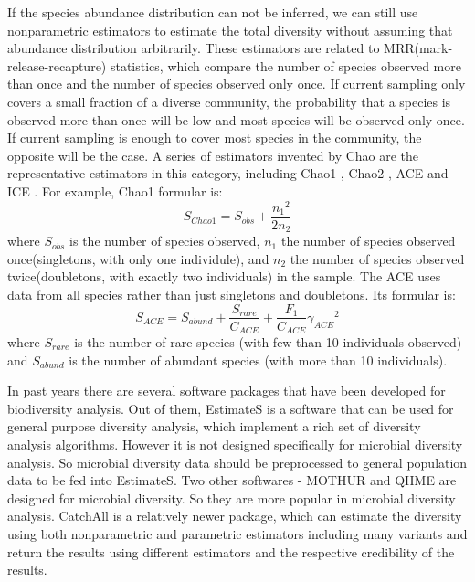 If the species abundance distribution can not be inferred, we can still use nonparametric estimators to estimate the 
total diversity without assuming that abundance distribution arbitrarily. These estimators are related to MRR(mark-release-recapture)
 statistics, which compare the number of species observed more than once and the number of species observed only once. 
If current sampling only covers a small fraction of a diverse community, the probability that a species is observed more
 than once will be low and most species will be observed only once. If current sampling is enough to cover most species in
 the community, the opposite will be the case. A series of estimators invented by Chao are the representative estimators
 in this category, including Chao1 \cite{chao1984nonparametric}, Chao2 \cite{Chao:1987aa}, ACE \cite{chao1993stopping} 
 and ICE \cite{lee1994estimating}. For example, Chao1 formular is:\\
 $${S}_{Chao1}={S}_{obs}+\frac{{{n}_{1}}^{2}}{2{n}_{2}}$$
 where ${S}_{obs}$ is the number of species observed, ${n}_{1}$ the number of species observed once(singletons, with only one individule),
 and ${n}_{2}$ the number of species observed twice(doubletons, with exactly two individuals) in the sample. The ACE uses data from
  all species rather than just singletons and doubletons. Its formular is:\\
 $${S}_{ACE}={S}_{abund}+\frac{{S}_{rare}}{{C}_{ACE}}+\frac{{F}_{1}}{{C}_{ACE}}{{\gamma }_{ACE}}^{2}$$
where ${S}_{rare}$ is the number of rare species (with few than 10 individuals observed) and ${S}_{abund}$ is the number of 
abundant species (with more than 10 individuals). 

In past years there are several software packages that have been developed for biodiversity
analysis. Out of them, EstimateS \cite{colwellestimates} is a software that can be used for general purpose diversity analysis,
which implement a rich set of diversity analysis algorithms. However it is not designed specifically
for microbial diversity analysis. So microbial diversity data should be preprocessed to general population data to be fed into
EstimateS. Two other softwares - MOTHUR \cite{Schloss:2009aa} and QIIME \cite{Caporaso:2010aa} are designed for microbial diversity. So they are more popular in 
microbial diversity analysis. CatchAll \cite{Bunge:2011aa} is a relatively newer package, which can estimate
the diversity using both nonparametric and parametric estimators including many variants and return the results 
using different estimators and the respective credibility of the results. 



